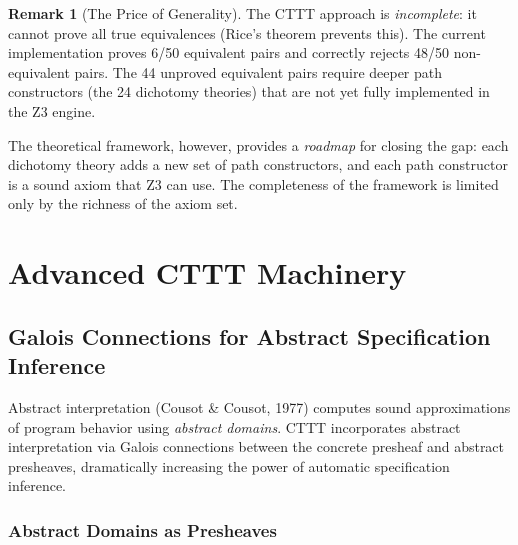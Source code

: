 \documentclass[11pt,a4paper]{report}
\theoremstyle{definition}
\newtheorem{remark}[definition]{Remark}
\theoremstyle{plain}
\begin{document}
\begin{remark}[The Price of Generality]
The CTTT approach is \emph{incomplete}: it cannot prove all true
equivalences (Rice's theorem prevents this).  The current implementation
proves 6/50 equivalent pairs and correctly rejects 48/50 non-equivalent
pairs.  The 44 unproved equivalent pairs require deeper path
constructors (the 24 dichotomy theories) that are not yet fully
implemented in the Z3 engine.

The theoretical framework, however, provides a \emph{roadmap} for
closing the gap: each dichotomy theory adds a new set of path
constructors, and each path constructor is a sound axiom that
Z3 can use.  The completeness of the framework is limited only by
the richness of the axiom set.
\end{remark}


\part{Advanced CTTT Machinery}

\chapter{Galois Connections for Abstract Specification Inference}
\label{ch:galois}

Abstract interpretation (Cousot \& Cousot, 1977) computes sound
approximations of program behavior using \emph{abstract domains}.
CTTT incorporates abstract interpretation via Galois connections
between the concrete presheaf and abstract presheaves, dramatically
increasing the power of automatic specification inference.

\section{Abstract Domains as Presheaves}
\end{document}
